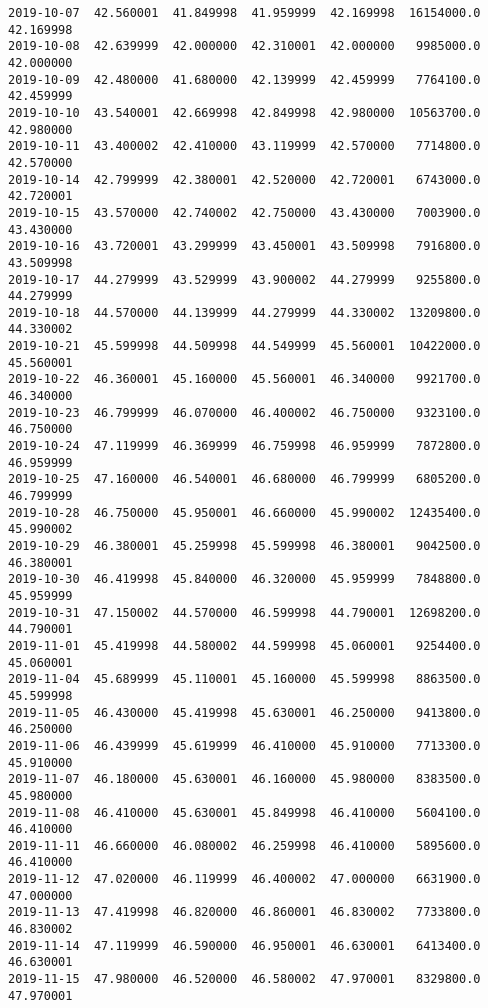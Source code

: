 \documentclass[11pt]{article}
\begin{document}
\begin{Verbatim}[commandchars=\\\{\}]
2019-10-07  42.560001  41.849998  41.959999  42.169998  16154000.0  42.169998
2019-10-08  42.639999  42.000000  42.310001  42.000000   9985000.0  42.000000
2019-10-09  42.480000  41.680000  42.139999  42.459999   7764100.0  42.459999
2019-10-10  43.540001  42.669998  42.849998  42.980000  10563700.0  42.980000
2019-10-11  43.400002  42.410000  43.119999  42.570000   7714800.0  42.570000
2019-10-14  42.799999  42.380001  42.520000  42.720001   6743000.0  42.720001
2019-10-15  43.570000  42.740002  42.750000  43.430000   7003900.0  43.430000
2019-10-16  43.720001  43.299999  43.450001  43.509998   7916800.0  43.509998
2019-10-17  44.279999  43.529999  43.900002  44.279999   9255800.0  44.279999
2019-10-18  44.570000  44.139999  44.279999  44.330002  13209800.0  44.330002
2019-10-21  45.599998  44.509998  44.549999  45.560001  10422000.0  45.560001
2019-10-22  46.360001  45.160000  45.560001  46.340000   9921700.0  46.340000
2019-10-23  46.799999  46.070000  46.400002  46.750000   9323100.0  46.750000
2019-10-24  47.119999  46.369999  46.759998  46.959999   7872800.0  46.959999
2019-10-25  47.160000  46.540001  46.680000  46.799999   6805200.0  46.799999
2019-10-28  46.750000  45.950001  46.660000  45.990002  12435400.0  45.990002
2019-10-29  46.380001  45.259998  45.599998  46.380001   9042500.0  46.380001
2019-10-30  46.419998  45.840000  46.320000  45.959999   7848800.0  45.959999
2019-10-31  47.150002  44.570000  46.599998  44.790001  12698200.0  44.790001
2019-11-01  45.419998  44.580002  44.599998  45.060001   9254400.0  45.060001
2019-11-04  45.689999  45.110001  45.160000  45.599998   8863500.0  45.599998
2019-11-05  46.430000  45.419998  45.630001  46.250000   9413800.0  46.250000
2019-11-06  46.439999  45.619999  46.410000  45.910000   7713300.0  45.910000
2019-11-07  46.180000  45.630001  46.160000  45.980000   8383500.0  45.980000
2019-11-08  46.410000  45.630001  45.849998  46.410000   5604100.0  46.410000
2019-11-11  46.660000  46.080002  46.259998  46.410000   5895600.0  46.410000
2019-11-12  47.020000  46.119999  46.400002  47.000000   6631900.0  47.000000
2019-11-13  47.419998  46.820000  46.860001  46.830002   7733800.0  46.830002
2019-11-14  47.119999  46.590000  46.950001  46.630001   6413400.0  46.630001
2019-11-15  47.980000  46.520000  46.580002  47.970001   8329800.0  47.970001


\end{Verbatim}
\end{document}
